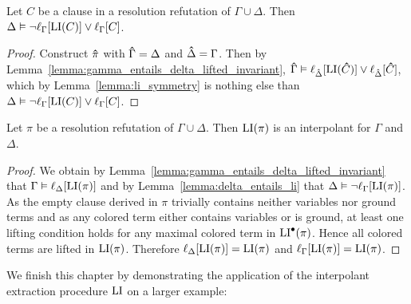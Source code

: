 \begin{lemma}
	\label{lemma:delta_entails_li}
	Let $C$ be a clause in a resolution refutation of $\Gamma \cup \Delta$.
	Then
	$\Delta \vDash \lnot\ell_{\Gamma}[\operatorname{LI}(C)] \lor \ell_{\Gamma}[C]$.
\end{lemma}
\begin{proof}
	Construct $\bm\hat \pi$ with $\bm\hat \Gamma = \Delta$ and $\bm\hat \Delta = \Gamma$. 
	Then by Lemma~\ref{lemma:gamma_entails_delta_lifted_invariant}, $\bm\hat \Gamma \vDash \ell_{\bm\hat \Delta}[\operatorname{LI}(\bm\hat C)] \lor \ell_{\bm\hat \Delta}[\bm\hat C]$, 
	which by Lemma~\ref{lemma:li_symmetry} is nothing else than
	$\Delta \vDash \lnot \ell_{\Gamma}[\operatorname{LI}(C)] \lor \ell_{\Gamma}[C]$.
\end{proof}

\begin{thm}
	Let $\pi$ be a resolution refutation of $\Gamma \cup \Delta$.
	Then $\operatorname{LI}(\pi)$ is an interpolant for $\Gamma$ and $\Delta$.
\end{thm}
\begin{proof}
	We obtain by Lemma~\ref{lemma:gamma_entails_delta_lifted_invariant} that  $\Gamma \vDash \ell_{\Delta}[\operatorname{LI}(\pi)]$ and
	by Lemma~\ref{lemma:delta_entails_li} that
	$\Delta \vDash \lnot\ell_{\Gamma}[\operatorname{LI}(\pi)]$.
	As the empty clause derived in $\pi$ trivially contains neither variables nor ground terms and as any colored term either contains variables or is ground, at least one lifting condition holds for any maximal colored term in $\operatorname{LI}^\bullet(\pi)$. Hence all colored terms are lifted in $\operatorname{LI}(\pi)$.
	Therefore $\ell_{\Delta}[\operatorname{LI}(\pi)] = \operatorname{LI}(\pi)$ and $\ell_{\Gamma}[\operatorname{LI}(\pi)] = \operatorname{LI}(\pi)$.
\end{proof}

We finish this chapter by demonstrating the application of the interpolant extraction procedure $\operatorname{LI}$ on a larger example:

